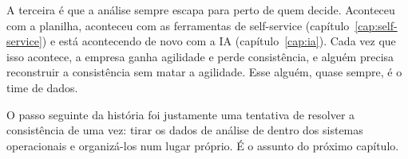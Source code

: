 A terceira é que a análise sempre escapa para perto de quem decide. Aconteceu com a
planilha, aconteceu com as ferramentas de self-service (capítulo~\ref{cap:self-service})
e está acontecendo de novo com a IA (capítulo~\ref{cap:ia}). Cada vez que isso acontece,
a empresa ganha agilidade e perde consistência, e alguém precisa reconstruir a
consistência sem matar a agilidade. Esse alguém, quase sempre, é o time de dados.

O passo seguinte da história foi justamente uma tentativa de resolver a consistência de
uma vez: tirar os dados de análise de dentro dos sistemas operacionais e organizá-los num
lugar próprio. É o assunto do próximo capítulo.

\begin{leituras}
\end{leituras}
